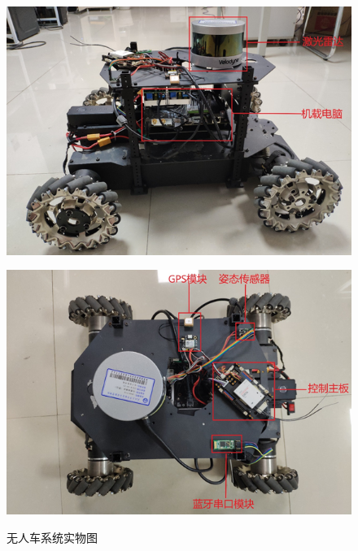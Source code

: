 \clearpage 	
\begin{figure}[htb]
	\centering
	\begin{minipage}[t]{\linewidth} 
		\centering
		\includegraphics[width=1\columnwidth]{figures/3-1a.png} 
		\label{fig:3-1a}
	\end{minipage}
	\begin{minipage}[t]{\linewidth} 
		\centering
		\includegraphics[width=1\columnwidth]{figures/3-1b.png} 
		\label{fig:3-1b} 
	\end{minipage}
	\caption{无人车系统实物图}
	\label{fig:3-1}
\end{figure}

